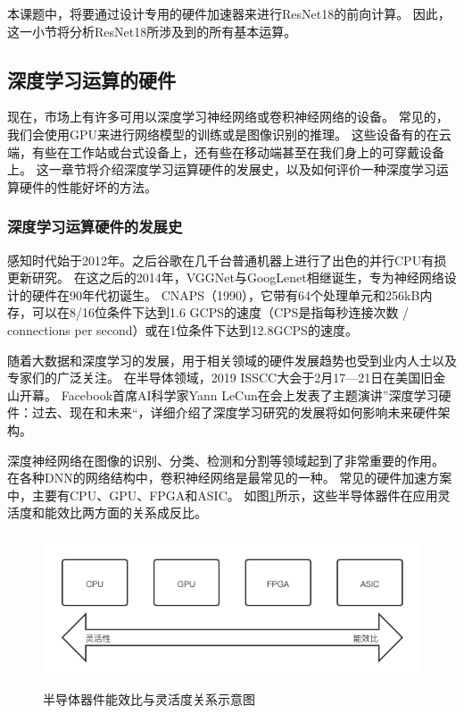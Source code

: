 本课题中，将要通过设计专用的硬件加速器来进行ResNet18的前向计算。
因此，这一小节将分析ResNet18所涉及到的所有基本运算。


\subsection{深度学习运算的硬件}
现在，市场上有许多可用以深度学习神经网络或卷积神经网络的设备。
常见的，我们会使用GPU来进行网络模型的训练或是图像识别的推理。
这些设备有的在云端，有些在工作站或台式设备上，还有些在移动端甚至在我们身上的可穿戴设备上。
这一章节将介绍深度学习运算硬件的发展史，以及如何评价一种深度学习运算硬件的性能好坏的方法。


\subsubsection{深度学习运算硬件的发展史}

感知时代始于2012年。之后谷歌在几千台普通机器上进行了出色的并行CPU有损更新研究。
在这之后的2014年，VGGNet与GoogLenet相继诞生，专为神经网络设计的硬件在90年代初诞生。
CNAPS（1990），它带有64个处理单元和256kB内存，可以在8/16位条件下达到1.6 GCPS的速度（CPS是指每秒连接次数 / connections per second）或在1位条件下达到12.8GCPS的速度。\cite{Heemskerk1995OverviewON}

随着大数据和深度学习的发展，用于相关领域的硬件发展趋势也受到业内人士以及专家们的广泛关注。
在半导体领域，2019 ISSCC大会于2月17—21日在美国旧金山开幕。
Facebook首席AI科学家Yann LeCun在会上发表了主题演讲”深度学习硬件：过去、现在和未来“，详细介绍了深度学习研究的发展将如何影响未来硬件架构。\cite{Yann2019DeepLH}


深度神经网络在图像的识别、分类、检测和分割等领域起到了非常重要的作用。
在各种DNN的网络结构中，卷积神经网络是最常见的一种。
常见的硬件加速方案中，主要有CPU、GPU、FPGA和ASIC。
如图\ref{fig:silicon_alternatives}所示，这些半导体器件在应用灵活度和能效比两方面的关系成反比。  
\begin{figure}[htbp]
    \centering
    \includegraphics[width=15cm,height=4.5cm]{figures/silicon_alternatives.png}
    \caption{半导体器件能效比与灵活度关系示意图}
    \label{fig:silicon_alternatives}
\end{figure}

